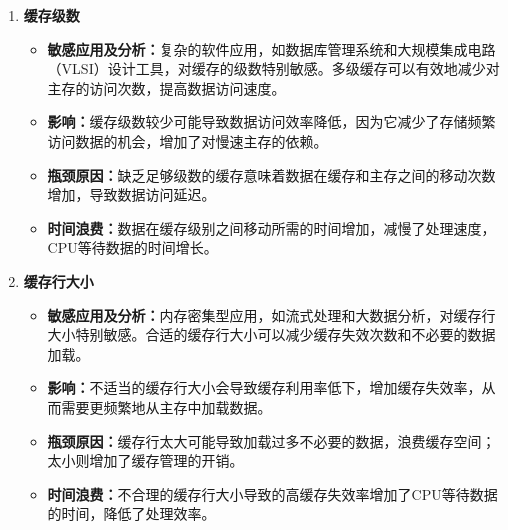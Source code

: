 \documentclass{article}
\begin{document}
\begin{enumerate}
  \item \textbf{缓存级数}
  \begin{itemize}
      \item \textbf{敏感应用及分析：}复杂的软件应用，如数据库管理系统和大规模集成电路（VLSI）设计工具，对缓存的级数特别敏感。多级缓存可以有效地减少对主存的访问次数，提高数据访问速度。
      \item \textbf{影响：}缓存级数较少可能导致数据访问效率降低，因为它减少了存储频繁访问数据的机会，增加了对慢速主存的依赖。
      \item \textbf{瓶颈原因：}缺乏足够级数的缓存意味着数据在缓存和主存之间的移动次数增加，导致数据访问延迟。
      \item \textbf{时间浪费：}数据在缓存级别之间移动所需的时间增加，减慢了处理速度，CPU等待数据的时间增长。
  \end{itemize}
  
  \item \textbf{缓存行大小}
  \begin{itemize}
      \item \textbf{敏感应用及分析：}内存密集型应用，如流式处理和大数据分析，对缓存行大小特别敏感。合适的缓存行大小可以减少缓存失效次数和不必要的数据加载。
      \item \textbf{影响：}不适当的缓存行大小会导致缓存利用率低下，增加缓存失效率，从而需要更频繁地从主存中加载数据。
      \item \textbf{瓶颈原因：}缓存行太大可能导致加载过多不必要的数据，浪费缓存空间；太小则增加了缓存管理的开销。
      \item \textbf{时间浪费：}不合理的缓存行大小导致的高缓存失效率增加了CPU等待数据的时间，降低了处理效率。
  \end{itemize}
\end{enumerate}
\end{document}
